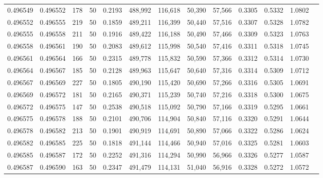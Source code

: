 \begin{tabular}{rrrrrrrrrrrrr}
0.496549 & 0.496552 &   178 &  50 &                                     0.2193 & 488,992 & 116,618 &  50,390 &  57,566 & 0.3305 & 0.5332 & 1.0802 \\
0.496552 & 0.496555 &   219 &  50 &                                     0.1859 & 489,211 & 116,399 &  50,440 &  57,516 & 0.3307 & 0.5328 & 1.0782 \\
0.496555 & 0.496558 &   211 &  50 &                                     0.1916 & 489,422 & 116,188 &  50,490 &  57,466 & 0.3309 & 0.5323 & 1.0763 \\
0.496558 & 0.496561 &   190 &  50 &                                     0.2083 & 489,612 & 115,998 &  50,540 &  57,416 & 0.3311 & 0.5318 & 1.0745 \\
0.496561 & 0.496564 &   166 &  50 &                                     0.2315 & 489,778 & 115,832 &  50,590 &  57,366 & 0.3312 & 0.5314 & 1.0730 \\
0.496564 & 0.496567 &   185 &  50 &                                     0.2128 & 489,963 & 115,647 &  50,640 &  57,316 & 0.3314 & 0.5309 & 1.0712 \\
0.496567 & 0.496569 &   227 &  50 &                                     0.1805 & 490,190 & 115,420 &  50,690 &  57,266 & 0.3316 & 0.5305 & 1.0691 \\
0.496569 & 0.496572 &   181 &  50 &                                     0.2165 & 490,371 & 115,239 &  50,740 &  57,216 & 0.3318 & 0.5300 & 1.0675 \\
0.496572 & 0.496575 &   147 &  50 &                                     0.2538 & 490,518 & 115,092 &  50,790 &  57,166 & 0.3319 & 0.5295 & 1.0661 \\
0.496575 & 0.496578 &   188 &  50 &                                     0.2101 & 490,706 & 114,904 &  50,840 &  57,116 & 0.3320 & 0.5291 & 1.0644 \\
0.496578 & 0.496582 &   213 &  50 &                                     0.1901 & 490,919 & 114,691 &  50,890 &  57,066 & 0.3322 & 0.5286 & 1.0624 \\
0.496582 & 0.496585 &   225 &  50 &                                     0.1818 & 491,144 & 114,466 &  50,940 &  57,016 & 0.3325 & 0.5281 & 1.0603 \\
0.496585 & 0.496587 &   172 &  50 &                                     0.2252 & 491,316 & 114,294 &  50,990 &  56,966 & 0.3326 & 0.5277 & 1.0587 \\
0.496587 & 0.496590 &   163 &  50 &                                     0.2347 & 491,479 & 114,131 &  51,040 &  56,916 & 0.3328 & 0.5272 & 1.0572 \\

\end{tabular}
